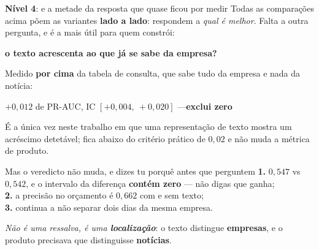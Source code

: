 \documentclass[aspectratio=169]{beamer}
\newcommand{\key}[1]{\textbf{\textcolor{blue!55!black}{#1}}}
\begin{document}
\begin{frame}{\key{Nível 4}: e a metade da resposta que quase ficou por medir}
Todas as comparações acima põem as variantes \textbf{lado a lado}: respondem a
\emph{qual é melhor}. Falta a outra pergunta, e é a mais útil para quem constrói:
\begin{center}
\textbf{o texto acrescenta ao que já se sabe da empresa?}
\end{center}
\vspace{2mm}
Medido \textbf{por cima} da tabela de consulta, que sabe tudo da empresa e nada da notícia:
\begin{center}
\key{$+0{,}012$} de PR-AUC, IC $[+0{,}004,\ +0{,}020]$ \quad ---\quad \textbf{exclui zero}
\end{center}
É a única vez neste trabalho em que uma representação de texto mostra um acréscimo detetável; fica
abaixo do critério prático de $0{,}02$ e não muda a métrica de produto.
\vspace{1mm}
\begin{block}{Mas o veredicto não muda, e dizes tu porquê antes que perguntem}
\textbf{1.} $0{,}547$ vs $0{,}542$, e o intervalo da diferença \textbf{contém zero} --- não
digas que ganha;\\
\textbf{2.} a precisão no orçamento é $0{,}662$ com e sem texto;\\
\textbf{3.} continua a não separar dois dias da mesma empresa.
\end{block}
\begin{center}
\small \emph{Não é uma ressalva, é uma \textbf{localização}}: o texto distingue
\textbf{empresas}, e o produto precisava que distinguisse \textbf{notícias}.
\end{center}
\end{frame}
\end{document}
